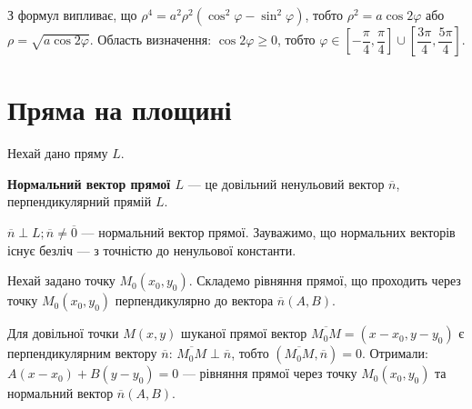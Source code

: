 \parbox{140px}{}
\parbox{7.2cm}{З формул випливає, що
$\rho^4 = a^2\rho^2(\cos^2 \varphi - \sin^2 \varphi)$, тобто
$\rho^2 = a\cos 2 \varphi$ або $\rho = \sqrt{a\cos 2 \varphi}$.
Область визначення: $\cos 2\varphi \geqslant0$,
тобто $\varphi \in \left[-\dfrac{\pi}{4}, \dfrac{\pi}{4}\right] \cup \left[\dfrac{3\pi}{4}, \dfrac{5\pi}{4}\right]$.}

\section{Пряма на площині}

Нехай дано пряму $L$.

\begin{definition}
	\textbf{Нормальний вектор прямої $L$} --- це довільний ненульовий вектор $\overline{n}$, перпендикулярний прямій $L$.
\end{definition}

\parbox{80px}{}
\parbox{9.3cm}{$\overline{n} \perp L; \overline{n} \neq \overline{0}$ --- нормальний вектор прямої.
Зауважимо, що нормальних векторів існує безліч --- з точністю до ненульової константи.}

Нехай задано точку $M_0(x_0, y_0)$. Складемо рівняння прямої, що проходить
через точку $M_0(x_0, y_0)$ перпендикулярно до вектора $\overline{n}(A, B)$.

Для довільної точки $M(x, y)$ шуканої прямої вектор $\overline{M_0 M} = (x-x_0, y-y_0)$ є
перпендикулярним вектору $\overline{n}$: $\overline{M_0 M} \perp \overline{n}$, тобто $(\overline{M_0 M}, \overline{n}) = 0$. Отримали:
$A(x-x_0) + B(y-y_0) = 0$ --- рівняння прямої через точку $M_0(x_0, y_0)$ та нормальний вектор $\overline{n}(A, B)$.

